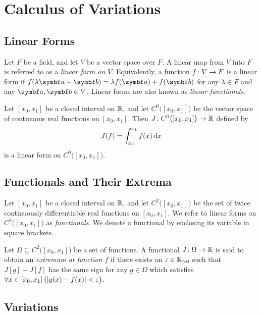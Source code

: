 



\section{Calculus of Variations}

\subsection{Linear Forms}

Let \(F\) be a field, and let \(V\) be a vector space over \(F\). A linear map from \(V\) into \(F\) is referred to as a
\emph{linear form on \(V\)}. Equivalently, a function \(f\colon V\to F\) is a linear form if \(f(\lambda \vct{a}
+ \vct{b}) = \lambda f(\vct{a}) + f(\vct{b})\) for any \(\lambda \in F\) and any \(\vct{a}, \vct{b} \in V\). Linear
forms are also known as \emph{linear functionals}.

Let \([x_0, x_1]\) be a closed interval on \(\mathbb{R}\), and let \(C^0\big([x_0, x_1]\big)\) be the vector space of
continuous real functions on \([x_0, x_1]\). Then \(J\colon C^0\big([x_0, x_1]\big)\to\mathbb{R}\) defined by
\[
  J(f) = \int_{x_0}^{x_1} f(x) \mathop{}\!\mathrm{d} x
\]
is a linear form on \(C^0\big([x_0, x_1]\big)\).

\subsection{Functionals and Their Extrema}

Let \([x_0, x_1]\) be a closed interval on \(\mathbb{R}\), and let \(C^2\big([x_0, x_1]\big)\) be the set of twice
continuously differentiable real functions on \([x_0, x_1]\). We refer to linear forms on \(C^2\big([x_0, x_1]\big)\) as
\emph{functionals}. We denote a functional by enclosing its variable in square brackets.

Let \(\Omega \subseteq C^2\big([x_0, x_1]\big)\) be a set of functions. A functional \(J\colon\Omega\to\mathbb{R}\) is
said to obtain an \emph{extremum at function \(f\)} if there exists an \(\varepsilon \in \mathbb{R}_{>0}\) such that \(J[g]
- J[f]\) has the same sign for any \(g \in \Omega\) which satisfies \(\forall x \in [x_0, x_1] \, \big(\lvert g(x) - f(x)\rvert
< \varepsilon\big)\).

\subsection{Variations}

